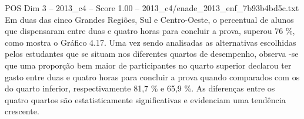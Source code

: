 \begin{textsample}{POS Dim 3 – 2013\_c4 – Score 1.00 – 2013\_c4/enade\_2013\_enf\_7b93b4bd5c.txt}
Em duas das cinco Grandes Regiões, Sul e Centro-Oeste, o percentual de alunos que dispensaram entre duas e quatro horas para concluir a prova, superou 76 \%, como mostra o Gráfico 4.17.
Uma vez sendo analisadas as alternativas escolhidas pelos estudantes que se situam nos diferentes quartos de desempenho, observa -se que uma proporção bem maior de participantes no quarto superior declarou ter gasto entre duas e quatro horas para concluir a prova quando comparados com os do quarto inferior, respectivamente 81,7 \% e 65,9 \%.
As diferenças entre os quatro quartos são estatisticamente significativas e evidenciam uma tendência crescente.

\end{textsample}

